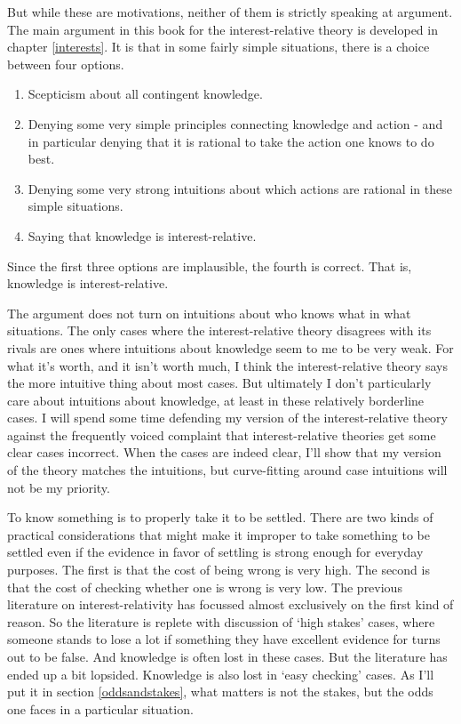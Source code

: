 \documentclass[
  11pt,
]{book}
\providecommand{\tightlist}{%
  \setlength{\itemsep}{0pt}\setlength{\parskip}{0pt}}
\begin{document}
But while these are motivations, neither of them is strictly speaking at argument. The main argument in this book for the interest-relative theory is developed in chapter \ref{interests}. It is that in some fairly simple situations, there is a choice between four options.

\begin{enumerate}
\def\labelenumi{\arabic{enumi}.}
\tightlist
\item
  Scepticism about all contingent knowledge.
\item
  Denying some very simple principles connecting knowledge and action - and in particular denying that it is rational to take the action one knows to do best.
\item
  Denying some very strong intuitions about which actions are rational in these simple situations.
\item
  Saying that knowledge is interest-relative.
\end{enumerate}

Since the first three options are implausible, the fourth is correct. That is, knowledge is interest-relative.

The argument does not turn on intuitions about who knows what in what situations. The only cases where the interest-relative theory disagrees with its rivals are ones where intuitions about knowledge seem to me to be very weak. For what it's worth, and it isn't worth much, I think the interest-relative theory says the more intuitive thing about most cases. But ultimately I don't particularly care about intuitions about knowledge, at least in these relatively borderline cases. I will spend some time defending my version of the interest-relative theory against the frequently voiced complaint that interest-relative theories get some clear cases incorrect. When the cases are indeed clear, I'll show that my version of the theory matches the intuitions, but curve-fitting around case intuitions will not be my priority.

To know something is to properly take it to be settled. There are two kinds of practical considerations that might make it improper to take something to be settled even if the evidence in favor of settling is strong enough for everyday purposes. The first is that the cost of being wrong is very high. The second is that the cost of checking whether one is wrong is very low. The previous literature on interest-relativity has focussed almost exclusively on the first kind of reason. So the literature is replete with discussion of `high stakes' cases, where someone stands to lose a lot if something they have excellent evidence for turns out to be false. And knowledge is often lost in these cases. But the literature has ended up a bit lopsided. Knowledge is also lost in `easy checking' cases. As I'll put it in section \ref{oddsandstakes}, what matters is not the stakes, but the odds one faces in a particular situation.
\end{document}
